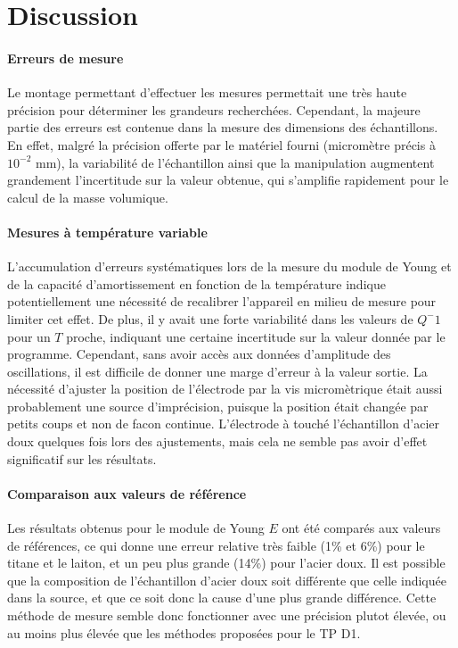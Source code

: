 \section{Discussion}

\paragraph{Erreurs de mesure} Le montage permettant d'effectuer les mesures permettait une très haute précision pour déterminer les grandeurs recherchées. Cependant, la majeure partie des erreurs est contenue dans la mesure des dimensions des échantillons. En effet, malgré la précision offerte par le matériel fourni (micromètre précis à \(10^{-2}\) \si{\milli\meter}), la variabilité de l'échantillon ainsi que la manipulation augmentent grandement l'incertitude sur la valeur obtenue, qui s'amplifie rapidement pour le calcul de la masse volumique.

\paragraph{Mesures à température variable} L'accumulation d'erreurs systématiques lors de la mesure du module de Young et de la capacité d'amortissement en fonction de la température indique potentiellement une nécessité de recalibrer l'appareil en milieu de mesure pour limiter cet effet. De plus, il y avait une forte variabilité dans les valeurs de \(Q^-1\) pour un \(T\) proche, indiquant une certaine incertitude sur la valeur donnée par le programme. Cependant, sans avoir accès aux données d'amplitude des oscillations, il est difficile de donner une marge d'erreur à la valeur sortie. La nécessité d'ajuster la position de l'électrode par la vis micromètrique était aussi probablement une source d'imprécision, puisque la position était changée par petits coups et non de facon continue. L'électrode à touché l'échantillon d'acier doux quelques fois lors des ajustements, mais cela ne semble pas avoir d'effet significatif sur les résultats.

\paragraph{Comparaison aux valeurs de référence} Les résultats obtenus pour le module de Young \(E\) ont été comparés aux valeurs de références, ce qui donne une erreur relative très faible (1\% et 6\%) pour le titane et le laiton, et un peu plus grande (14\%) pour l'acier doux. Il est possible que la composition de l'échantillon d'acier doux soit différente que celle indiquée dans la source, et que ce soit donc la cause d'une plus grande différence. Cette méthode de mesure semble donc fonctionner avec une précision plutot élevée, ou au moins plus élevée que les méthodes proposées pour le TP D1.


